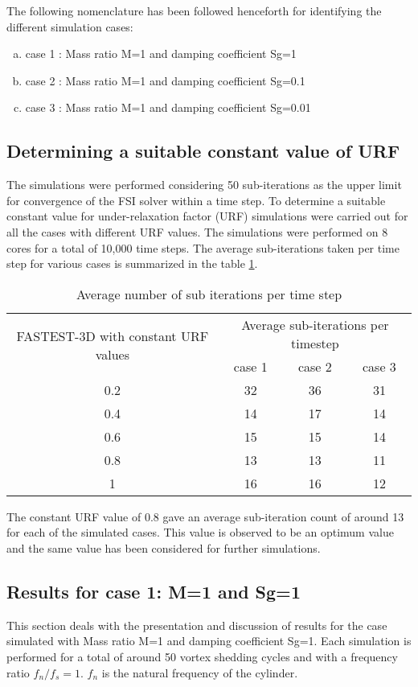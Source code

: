 The following nomenclature has been followed henceforth for identifying the different simulation cases:

\begin{enumerate}[(a)]
\item case 1 : Mass ratio M=1 and damping coefficient Sg=1
\item case 2 : Mass ratio M=1 and damping coefficient Sg=0.1
\item case 3 : Mass ratio M=1 and damping coefficient Sg=0.01
\end{enumerate}

\subsection{Determining a suitable constant value of URF}
The simulations were performed considering 50 sub-iterations as the upper limit for convergence of the FSI solver within a time step. To determine a suitable constant value for under-relaxation factor (URF) simulations were carried out for all the cases with different URF values. The simulations were performed on 8 cores for a total of 10,000 time steps. The average sub-iterations taken per time step for various cases is summarized in the table \ref{table:4.5}.\\

\begin{table}[htbp]
  \centering
  	\begin{tabular}{|c|c|c|c|}
	\hline 
	\multirow{2}{*}{FASTEST-3D with constant URF values} & \multicolumn{3}{c|}{Average sub-iterations per timestep}\tabularnewline
	\cline{2-4} 
	 & case 1 & case 2  & case 3\tabularnewline
	\hline 
	0.2 & 32 & 36 & 31\tabularnewline
	\hline 
	0.4 & 14 & 17 & 14\tabularnewline
	\hline 
	0.6 & 15 & 15 & 14\tabularnewline
	\hline 
	\rowcolor[rgb]{ .573,  .816,  .314} 0.8 & 13 & 13 & 11\tabularnewline
	\hline 
	1 & 16 & 16 & 12\tabularnewline
	\hline 
	\end{tabular}
  \caption{Average number of sub iterations per time step}
  \label{table:4.5}%
\end{table}%

The constant URF value of 0.8 gave an average sub-iteration count of around 13 for each of the simulated cases. This value is observed to be an optimum value and the same value has been considered for further simulations.

\subsection{Results for case 1: M=1 and Sg=1}
This section deals with the presentation and discussion of results for the case simulated with Mass ratio M=1 and damping coefficient Sg=1. Each simulation is performed for a total of around 50 vortex shedding cycles and with a frequency ratio $f_n/f_s = 1$. $f_n$ is the natural frequency of the cylinder.

